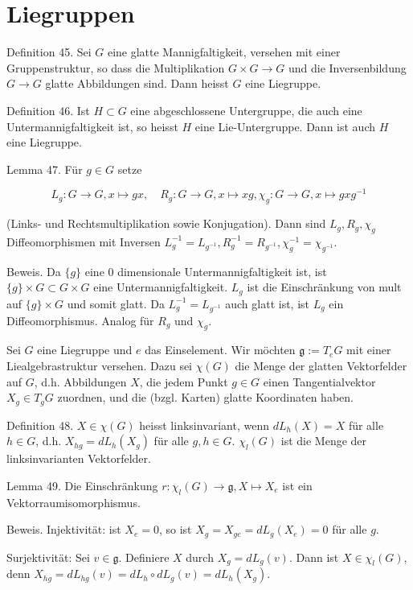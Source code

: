 \documentclass[10pt, letterpaper]{article}
\begin{document}
\section{Liegruppen}

Definition 45. Sei $G$ eine glatte Mannigfaltigkeit, versehen mit einer Gruppenstruktur, so dass die Multiplikation $G \times G \rightarrow G$ und die Inversenbildung $G \rightarrow G$ glatte Abbildungen sind. Dann heisst $G$ eine Liegruppe.

Definition 46. Ist $H \subset G$ eine abgeschlossene Untergruppe, die auch eine Untermannigfaltigkeit ist, so heisst $H$ eine Lie-Untergruppe. Dann ist auch $H$ eine Liegruppe.

Lemma 47. Für $g \in G$ setze

$$
L_{g}: G \rightarrow G, x \mapsto g x, \quad R_{g}: G \rightarrow G, x \mapsto x g, \chi_{g}: G \rightarrow G, x \mapsto g x g^{-1}
$$

(Links- und Rechtsmultiplikation sowie Konjugation). Dann sind $L_{g}, R_{g}, \chi_{g}$ Diffeomorphismen mit Inversen $L_{g}^{-1}=L_{g^{-1}}, R_{g}^{-1}=R_{g^{-1}}, \chi_{g}^{-1}=\chi_{g^{-1}}$.

Beweis. Da $\{g\}$ eine 0 dimensionale Untermannigfaltigkeit ist, ist $\{g\} \times G \subset G \times G$ eine Untermannigfaltigkeit. $L_{g}$ ist die Einschränkung von mult auf $\{g\} \times G$ und somit glatt. Da $L_{g}^{-1}=L_{g^{-1}}$ auch glatt ist, ist $L_{g}$ ein Diffeomorphismus. Analog für $R_{g}$ und $\chi_{g}$.



Sei $G$ eine Liegruppe und $e$ das Einselement. Wir möchten $\mathfrak{g}:=T_{e} G$ mit einer Liealgebrastruktur versehen. Dazu sei $\chi(G)$ die Menge der glatten Vektorfelder auf $G$, d.h. Abbildungen $X$, die jedem Punkt $g \in G$ einen Tangentialvektor $X_{g} \in T_{g} G$ zuordnen, und die (bzgl. Karten) glatte Koordinaten haben.

Definition 48. $X \in \chi(G)$ heisst linksinvariant, wenn $d L_{h}(X)= X$ für alle $h \in G$, d.h. $X_{h g}=d L_{h}\left(X_{g}\right)$ für alle $g, h \in G$. $\chi_{l}(G)$ ist die Menge der linksinvarianten Vektorfelder.

Lemma 49. Die Einschränkung $r: \chi_{l}(G) \rightarrow \mathfrak{g}, X \mapsto X_{e}$ ist ein Vektorraumisomorphismus.

Beweis. Injektivität: ist $X_{e}=0$, so ist $X_{g}=X_{g e}=d L_{g}\left(X_{e}\right)=0$ für alle $g$.

Surjektivität: Sei $v \in \mathfrak{g}$. Definiere $X$ durch $X_{g}=d L_{g}(v)$. Dann ist $X \in \chi_{l}(G)$, denn $X_{h g}=d L_{h g}(v)=d L_{h} \circ d L_{g}(v)=d L_{h}\left(X_{g}\right)$.
\end{document}
